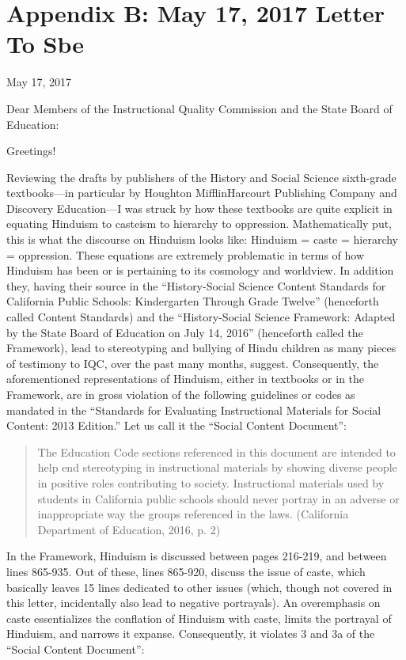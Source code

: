 \chapter{Appendix B: May 17, 2017 Letter To Sbe}

May 17, 2017

Dear Members of the Instructional Quality Commission and the State Board of Education:

Greetings!

Reviewing the drafts by publishers of the History and Social Science sixth-grade textbooks—in particular by Houghton MifflinHarcourt Publishing Company and Discovery Education—I was struck by how these textbooks are quite explicit in equating Hinduism to casteism to hierarchy to oppression. Mathematically put, this is what the discourse on Hinduism looks like: Hinduism = caste = hierarchy = oppression. These equations are extremely problematic in terms of how Hinduism has been or is pertaining to its cosmology and worldview. In addition they, having their source in the “History-Social Science Content Standards for California Public Schools: Kindergarten Through Grade Twelve” (henceforth called Content Standards) and the “History-Social Science Framework: Adapted by the State Board of Education on July 14, 2016” (henceforth called the Framework), lead to stereotyping and bullying of Hindu children as many pieces of testimony to IQC, over the past many months, suggest. Consequently, the aforementioned representations of Hinduism, either in textbooks or in the Framework, are in gross violation of the following guidelines or codes as mandated in the “Standards for Evaluating Instructional Materials for Social Content: 2013 Edition.” Let us call it the “Social Content Document”: 
\begin{quote}
The Education Code sections referenced in this document are intended to help end stereotyping in instructional materials by showing diverse people in positive roles contributing to society. Instructional materials used by students in California public schools should never portray in an adverse or inappropriate way the groups referenced in the laws. (California Department of Education, 2016, p. 2)
\end{quote}
In the Framework, Hinduism is discussed between pages 216-219, and between lines 865-935. Out of these, lines 865-920, discuss the issue of caste, which basically leaves 15 lines dedicated to other issues (which, though not covered in this letter, incidentally also lead to negative portrayals). An overemphasis on caste essentializes the conflation of Hinduism with caste, limits the portrayal of Hinduism, and narrows it expanse. Consequently, it violates 3 and 3a of the “Social Content Document”:


